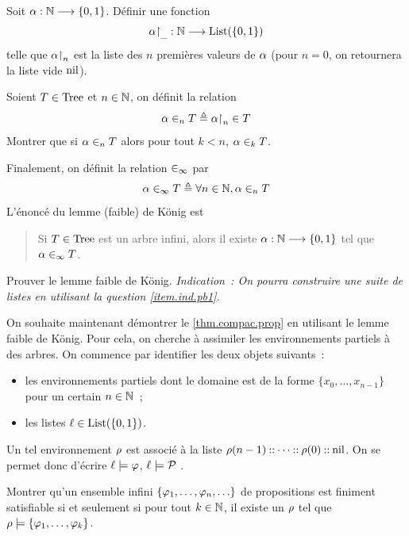 \begin{problem}
  \begin{pbQuest}[resume]
  \item Soit $\alpha : \displaystyle \mathbb N \longrightarrow \{0,1\}$. Définir une fonction
    \[\alpha\mathbin{\upharpoonright}_{\mathord{\_}} : \displaystyle \mathbb N \longrightarrow \operatorname{List}(\{0,1\})\]
    telle que $\alpha\mathbin{\upharpoonright}_{n}$ est la liste des $n$ premières valeurs de
    $\alpha$ (pour $n = 0$, on retournera la liste vide $\operatorname{nil}$).
  \item Soient $T\in \operatorname{Tree}$ et $n \in \mathbb N$, on définit la relation
    \[\alpha \in_{n} T \triangleq \alpha\mathbin{\upharpoonright}_{n} \in T\]
    Montrer que si $\alpha\in_{n} T$ alors pour tout $k < n$,
    $\alpha\in_{k}T$.
  \end{pbQuest}

  \noindent
  Finalement, on définit la relation $\in_{\infty}$ par
  \[\alpha\in_{\infty} T \triangleq \forall n \in \mathbb N,
  \alpha\in_{n}T\]
  L'énoncé du lemme (faible) de König est
  \begin{quotation}
    \noindent
    Si $T \in \operatorname{Tree}$ est un arbre infini, alors il existe
    $\alpha : \displaystyle \mathbb N \longrightarrow \{0,1\}$ tel que
    $\alpha \in_{\infty} T$.
  \end{quotation}

  \begin{pbQuest}[resume]
  \item Prouver le lemme faible de König. \textit{Indication~: On pourra
    construire une suite de listes en utilisant la question \ref{item.ind.pb1}.}
  \end{pbQuest}


  \noindent
  On souhaite maintenant démontrer le \cref{thm.compac.prop} en utilisant le
  lemme faible de König. Pour cela, on cherche à assimiler les environnements
  partiels à des arbres. On commence par identifier les deux objets
  suivants~:
  \begin{itemize}
  \item les environnements partiels dont le domaine est de la forme
    $\{x_0,\ldots,x_{n-1}\}$ pour un certain $n \in \mathbb N$~;
  \item les listes $\ell \in \operatorname{List}(\{0,1\})$.
  \end{itemize}
  Un tel environnement $\rho$ est associé à la liste
  $\rho(n-1) \mathbin{::} \cdots\mathbin{::}\rho(0) \mathbin{::} \operatorname{nil}$. On se permet donc d'écrire
  $\ell \models \varphi$, $\ell \models \mathcal P$ .

  \begin{pbQuest}
  \item Montrer qu'un ensemble infini $\{\varphi_1,\ldots,\varphi_n,\ldots\}$
    de propositions est finiment satisfiable
    si et seulement si pour tout $k \in \mathbb N$, il existe un $\rho$
    tel que $\rho \models \{\varphi_1,\ldots,\varphi_k\}$.
  \end{pbQuest}


\end{problem}
